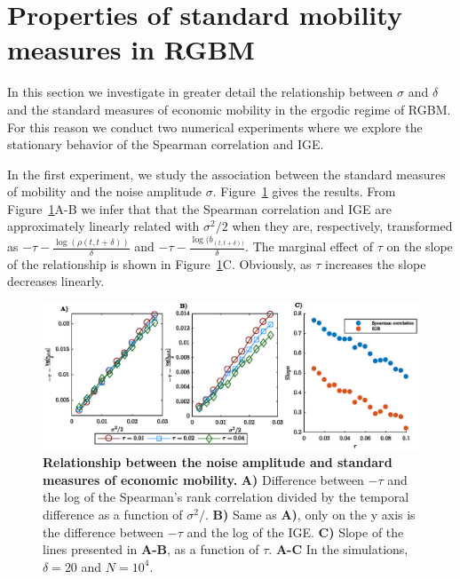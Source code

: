 \documentclass[11pt]{article}
\newcommand{\Fref}[1]{Figure~\ref{fig:#1}}
\numberwithin{equation}{section}
\begin{document}
\section{Properties of standard mobility measures in RGBM}\label{sec:properties-standard-mobility-measures}

In this section we investigate in greater detail the relationship between $\sigma$ and $\delta$ and the standard measures of economic mobility in the ergodic regime of RGBM. For this reason we conduct two numerical experiments where we explore the stationary behavior of the Spearman correlation and IGE. 

In the first experiment, we study the association between the standard measures of mobility and the noise amplitude $\sigma$. \Fref{rgbm-standard-measures-sigma} gives the results. From \Fref{rgbm-standard-measures-sigma}A-B we infer that that the Spearman correlation and IGE are approximately linearly related with $\sigma^2/2$ when they are, respectively, transformed as $-\tau - \frac{\log(\rho(t,t+\delta))}{\delta}$ and $-\tau - \frac{\log(b_{(t,t+\delta))}}{\delta}$. The marginal effect of $\tau$ on the slope of the relationship is shown in \Fref{rgbm-standard-measures-sigma}C. Obviously, as $\tau$ increases the slope decreases linearly.

\begin{figure}[!htb]
\centering
\includegraphics[width=1.0\textwidth]{figs/fig_rgbm_sigma_relationship.eps}
\caption{\textbf{Relationship between the noise amplitude and standard measures of economic mobility.} \textbf{A)} Difference between $-\tau$ and the log of the Spearman's rank correlation divided by the temporal difference as a function of $\sigma^2/$. \textbf{B)} Same as \textbf{A)}, only on the y axis is the difference between $-\tau$ and the log of the IGE. \textbf{C)} Slope of the lines presented in \textbf{A-B}, as a function of $\tau$. 
\textbf{A-C} In the simulations, $\delta = 20$ and $N = 10^4$.
\label{fig:rgbm-standard-measures-sigma}}
\end{figure}
\FloatBarrier
\end{document}
